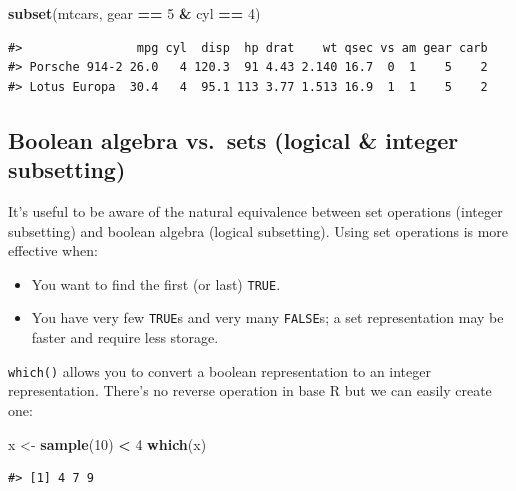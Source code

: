 \documentclass[]{book}
\newenvironment{Shaded}{\begin{snugshade}}{\end{snugshade}}
\newcommand{\KeywordTok}[1]{\textcolor[rgb]{0.13,0.29,0.53}{\textbf{#1}}}
\newcommand{\DecValTok}[1]{\textcolor[rgb]{0.00,0.00,0.81}{#1}}
\newcommand{\StringTok}[1]{\textcolor[rgb]{0.31,0.60,0.02}{#1}}
\newcommand{\OperatorTok}[1]{\textcolor[rgb]{0.81,0.36,0.00}{\textbf{#1}}}
\newcommand{\NormalTok}[1]{#1}
\theoremstyle{definition}
\theoremstyle{definition}
\theoremstyle{definition}
\theoremstyle{remark}
\begin{document}
\begin{Shaded}
\begin{Highlighting}[]
\KeywordTok{subset}\NormalTok{(mtcars, gear }\OperatorTok{==}\StringTok{ }\DecValTok{5} \OperatorTok{&}\StringTok{ }\NormalTok{cyl }\OperatorTok{==}\StringTok{ }\DecValTok{4}\NormalTok{)}
\end{Highlighting}
\end{Shaded}

\begin{verbatim}
#>                mpg cyl  disp  hp drat    wt qsec vs am gear carb
#> Porsche 914-2 26.0   4 120.3  91 4.43 2.140 16.7  0  1    5    2
#> Lotus Europa  30.4   4  95.1 113 3.77 1.513 16.9  1  1    5    2
\end{verbatim}

\subsection{Boolean algebra vs.~sets (logical \& integer
subsetting)}\label{boolean-algebra-vs.sets-logical-integer-subsetting}

It's useful to be aware of the natural equivalence between set
operations (integer subsetting) and boolean algebra (logical
subsetting). Using set operations is more effective when:

\begin{itemize}
\item
  You want to find the first (or last) \texttt{TRUE}.
\item
  You have very few \texttt{TRUE}s and very many \texttt{FALSE}s; a set
  representation may be faster and require less storage.
\end{itemize}

\texttt{which()} allows you to convert a boolean representation to an
integer representation. There's no reverse operation in base R but we
can easily create one:

\begin{Shaded}
\begin{Highlighting}[]
\NormalTok{x <-}\StringTok{ }\KeywordTok{sample}\NormalTok{(}\DecValTok{10}\NormalTok{) }\OperatorTok{<}\StringTok{ }\DecValTok{4}
\KeywordTok{which}\NormalTok{(x)}
\end{Highlighting}
\end{Shaded}

\begin{verbatim}
#> [1] 4 7 9
\end{verbatim}
\end{document}
